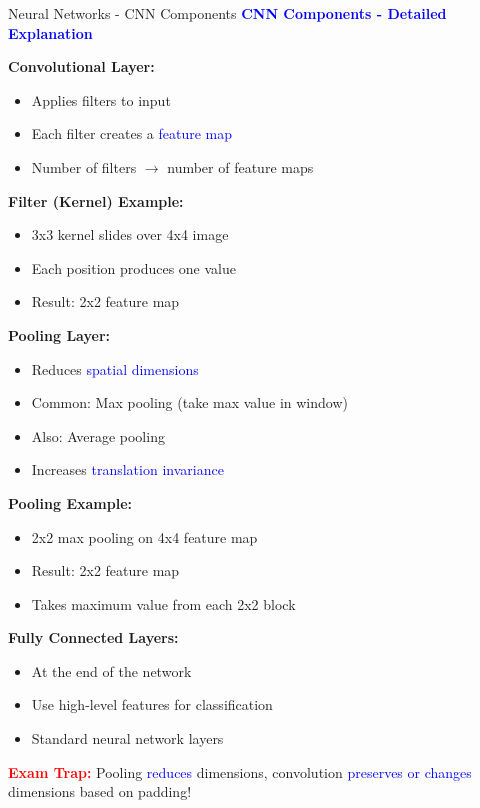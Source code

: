 \documentclass[8pt]{beamer}
\begin{document}
	\begin{frame}{Neural Networks - CNN Components}
		\fontsize{6.5}{7.5}\selectfont
		\textcolor{blue}{\textbf{CNN Components - Detailed Explanation}}
		
		\textbf{Convolutional Layer:}
		\begin{itemize}
			\item Applies filters to input
			\item Each filter creates a \textcolor{blue}{feature map}
			\item Number of filters $\rightarrow$ number of feature maps
		\end{itemize}
		
		\textbf{Filter (Kernel) Example:}
		\begin{itemize}
			\item 3x3 kernel slides over 4x4 image
			\item Each position produces one value
			\item Result: 2x2 feature map
		\end{itemize}
		
		\textbf{Pooling Layer:}
		\begin{itemize}
			\item Reduces \textcolor{blue}{spatial dimensions}
			\item Common: Max pooling (take max value in window)
			\item Also: Average pooling
			\item Increases \textcolor{blue}{translation invariance}
		\end{itemize}
		
		\textbf{Pooling Example:}
		\begin{itemize}
			\item 2x2 max pooling on 4x4 feature map
			\item Result: 2x2 feature map
			\item Takes maximum value from each 2x2 block
		\end{itemize}
		
		\textbf{Fully Connected Layers:}
		\begin{itemize}
			\item At the end of the network
			\item Use high-level features for classification
			\item Standard neural network layers
		\end{itemize}
		
		\textcolor{red}{\textbf{Exam Trap:}} Pooling \textcolor{blue}{reduces} dimensions, convolution \textcolor{blue}{preserves or changes} dimensions based on padding!
	\end{frame}
	
\end{document}

